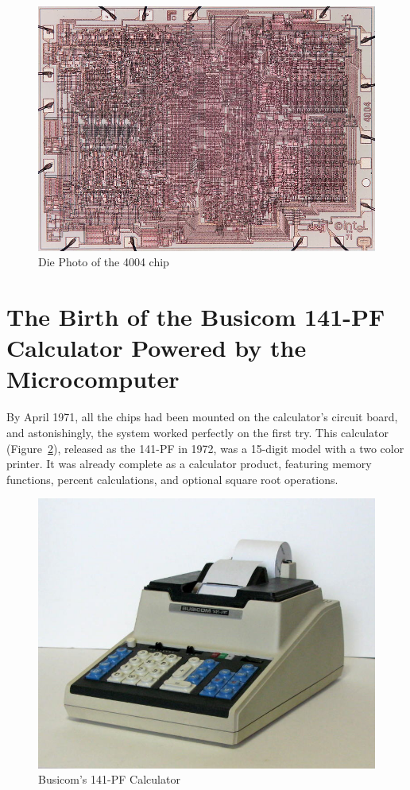 \begin{figure}
    \includegraphics[width=1.0\columnwidth]{./Figure/DieShot_4004.png}
    \caption{Die Photo of the 4004 chip\protect\footnotemark[3]}
    \label{fig:DieShot_4004}
\end{figure}

\section{The Birth of the Busicom 141-PF Calculator Powered by the Microcomputer}
By April 1971, all the chips had been mounted on the calculator's circuit board, and astonishingly, the system worked perfectly on the first try. This calculator (Figure~\ref{fig:CALC141PF}), released as the 141-PF in 1972, was a 15-digit model with a two color printer. It was already complete as a calculator product, featuring memory functions, percent calculations, and optional square root operations.

\begin{figure}
    \includegraphics[width=0.75\columnwidth]{./Figure/Busicom_141-PF.png}
    \caption{Busicom's 141-PF Calculator\protect\footnotemark[4]}
    \label{fig:CALC141PF}
\end{figure}


